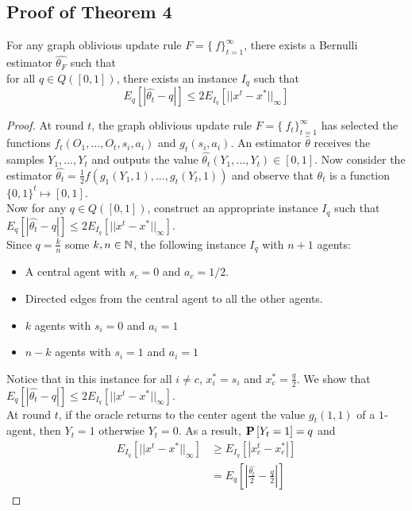 \subsection{Proof of Theorem 4}
\begin{lemma}
For any graph oblivious update rule $F=\{\ f \}_{t=1}^\infty$, there exists a Bernulli estimator $\hat{\theta_F}$ such that\\
for all $q \in Q([0,1])$, there exists an instance $I_q$ such that $$E_q[|\hat{\theta_t} - q|] \leq 2E_{I_q}[||x^t-x^*||_{\infty}]$$
\end{lemma}

\begin{proof}
At round $t$, the graph oblivious update rule $F=\{\ f_t\}_{t=1}^\infty$ has selected the functions $f_t(O_1,\ldots,O_t,s_i,a_i)$ and $g_t(s_i,a_i)$. An estimator $\hat{\theta}$ receives the samples $Y_1,\ldots,Y_t$ and outputs the value $\hat{\theta_t}(Y_1,\ldots,Y_t) \in [0,1]$. Now consider the estimator $\hat{\theta_t}=\frac{1}{2}f(g_1(Y_1,1),\ldots,g_t(Y_t,1))$ and observe that $\hat{\theta_t}$ is a function $\{0,1\}^t \mapsto [0,1]$.\\
Now for any $q \in Q([0,1])$, construct an appropriate instance $I_q$ such that $E_q[|\hat{\theta_t} - q|] \leq 2E_{I_q}[||x^t-x^*||_{\infty}]$.\\
Since $q=\frac{k}{n}$ some $k,n \in \mathbb{N}$, the following instance $I_q$ with $n+1$ agents:
\begin{itemize}
 \item A central agent with $s_c=0$ and $a_c=1/2$.
 \item Directed edges from the central agent to all the other agents.
 \item $k$ agents with $s_i=0$ and $a_i=1$
 \item $n-k$ agents with $s_i=1$ and $a_i=1$
 \end{itemize}
Notice that in this instance for all $i\neq c$, $x^*_i=s_i$ and $x^*_c=\frac{q}{2}$. We show that $E_q[|\hat{\theta_t}-q|] \leq 2E_{I_q}[||x^t-x^*||_{\infty}]$.\\
At round $t$, if the oracle returns to the center agent the value $g_t(1,1)$ of a $1$-agent, then $Y_t=1$ otherwise $Y_t=0$. As a result, $\bm{\mathrm{P}}\left[Y_t=1\right]=q$ and 
\begin{align*}
 E_{I_q}[||x^t-x^*||_{\infty}] &\geq E_{I_q}[|x^t_c-x^*_c|]\\
 &= E_{q}[|\frac{\hat{\theta_t}}{2}-\frac{q}{2}|]
\end{align*}
\end{proof}

